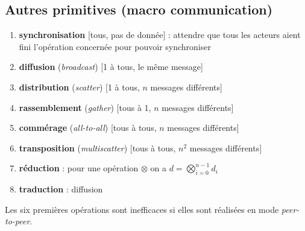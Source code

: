 \documentclass[12pt, a4paper]{article}
\begin{document}
    \subsection{Autres primitives (macro communication)}
      \begin{enumerate}
        \item \textbf{synchronisation} [tous, pas de donnée] : attendre que tous les
        acteurs aient fini l'opération concernée pour pouvoir synchroniser
        \item \textbf{diffusion} (\textit{broadcast}) [1 à tous, le même
        message]
        \item \textbf{distribution} (\textit{scatter}) [1 à tous, $n$ messages
        différents]
        \item \textbf{rassemblement} (\textit{gather}) [tous à 1, $n$ messages
        différents]
        \item \textbf{commérage} (\textit{all-to-all}) [tous à tous, $n$
        messages différents]
        \item \textbf{transposition} (\textit{multiscatter}) [tous à tous, $n^2$
         messages différents]
        \item \textbf{réduction} : pour une opération $\otimes$ on a $d = \bigotimes_{i = 0}^{n - 1} d_i$
        \item \textbf{traduction} : diffusion
      \end{enumerate}
      Les six premières opérations sont inefficaces si elles sont réalisées en
      mode \textit{peer-to-peer}.
\end{document}
